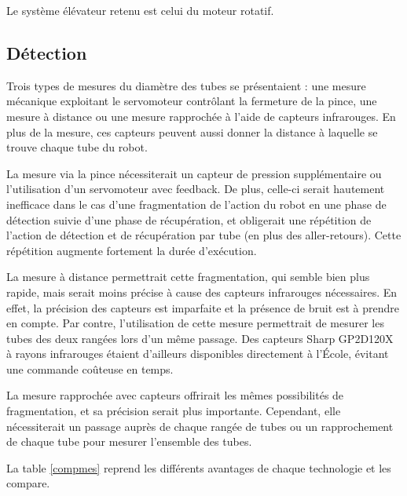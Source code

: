 \documentclass[a4paper,11pt]{article}
\begin{document}
Le système élévateur retenu est celui du moteur rotatif.

\subsection{\label{detec}Détection}

Trois types de mesures du diamètre des tubes se présentaient : une mesure mécanique exploitant le servomoteur contrôlant la fermeture de la pince, une mesure à distance ou une mesure rapprochée à l'aide de capteurs infrarouges. En plus de la mesure, ces capteurs peuvent aussi donner la distance à laquelle se trouve chaque tube du robot.

La mesure via la pince nécessiterait un capteur de pression supplémentaire ou l'utilisation d'un servomoteur avec feedback. De plus, celle-ci serait hautement inefficace dans le cas d'une fragmentation de l'action du robot en une phase de détection suivie d'une phase de récupération, et obligerait une répétition de l'action de détection et de récupération par tube (en plus des aller-retours). Cette répétition augmente fortement la durée d'exécution.

La mesure à distance permettrait cette fragmentation, qui semble bien plus rapide, mais serait moins précise à cause des capteurs infrarouges nécessaires. En effet, la précision des capteurs est imparfaite et la présence de bruit est à prendre en compte. Par contre, l'utilisation de cette mesure permettrait de mesurer les tubes des deux rangées lors d'un même passage. Des capteurs Sharp GP2D120X à rayons infrarouges \cite{captdist} étaient d'ailleurs disponibles directement à l'École, évitant une commande coûteuse en temps.

La mesure rapprochée avec capteurs offrirait les mêmes possibilités de fragmentation, et sa précision serait plus importante. Cependant, elle nécessiterait un passage auprès de chaque rangée de tubes ou un rapprochement de chaque tube pour mesurer l'ensemble des tubes.

La table \ref{compmes} reprend les différents avantages de chaque technologie et les compare.
\end{document}

